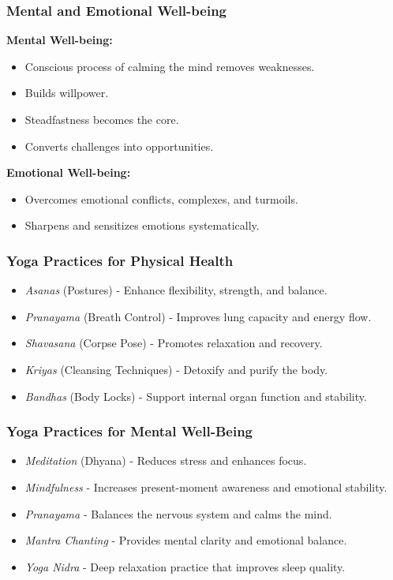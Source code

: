 \begin{frame}[fragile]\frametitle{Mental and Emotional Well-being}
    \textbf{Mental Well-being:}
    \begin{itemize}
        \item Conscious process of calming the mind removes weaknesses.
        \item Builds willpower.
        \item Steadfastness becomes the core.
        \item Converts challenges into opportunities.
    \end{itemize}

    
    \textbf{Emotional Well-being:}
    \begin{itemize}
        \item Overcomes emotional conflicts, complexes, and turmoils.
        \item Sharpens and sensitizes emotions systematically.
    \end{itemize}
\end{frame}




\begin{frame}[fragile]\frametitle{Yoga Practices for Physical Health}

      \begin{itemize}
		\item \textit{Asanas} (Postures) - Enhance flexibility, strength, and balance.
		\item \textit{Pranayama} (Breath Control) - Improves lung capacity and energy flow.
		\item \textit{Shavasana} (Corpse Pose) - Promotes relaxation and recovery.
		\item \textit{Kriyas} (Cleansing Techniques) - Detoxify and purify the body.
		\item \textit{Bandhas} (Body Locks) - Support internal organ function and stability.
	  \end{itemize}

\end{frame}

\begin{frame}[fragile]\frametitle{Yoga Practices for Mental Well-Being}

      \begin{itemize}
		\item \textit{Meditation} (Dhyana) - Reduces stress and enhances focus.
		\item \textit{Mindfulness} - Increases present-moment awareness and emotional stability.
		\item \textit{Pranayama} - Balances the nervous system and calms the mind.
		\item \textit{Mantra Chanting} - Provides mental clarity and emotional balance.
		\item \textit{Yoga Nidra} - Deep relaxation practice that improves sleep quality.
	  \end{itemize}

\end{frame}

